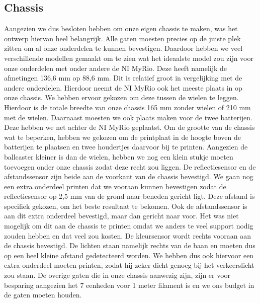 \documentclass[kulak]{kulakarticle} %
\begin{document}
\subsection{Chassis}
Aangezien we dus besloten hebben om onze eigen chassis te maken, was het ontwerp hiervan heel belangrijk. Alle gaten moesten precies op de juiste plek zitten om al onze onderdelen te kunnen bevestigen. Daardoor hebben we veel verschillende modellen gemaakt om te zien wat het ideaalste model zou zijn voor onze onderdelen met onder andere de NI MyRio. Deze heeft namelijk de afmetingen 136,6 mm op 88,6 mm. Dit is relatief groot in vergelijking met de andere onderdelen. Hierdoor neemt de NI MyRio ook het meeste plaats in op onze chassis. We hebben ervoor gekozen om deze tussen de wielen te leggen. Hierdoor is de totale breedte van onze chassis 165 mm zonder wielen of 210 mm met de wielen. Daarnaast moesten we ook plaats maken voor de twee batterijen. Deze hebben we net achter de NI MyRio geplaatst. Om de grootte van de chassis wat te beperken, hebben we gekozen om de printplaat in de hoogte boven de batterijen te plaatsen en twee houdertjes daarvoor bij te printen. Aangezien de ballcaster kleiner is dan de wielen, hebben we nog een klein stukje moeten toevoegen onder onze chassis zodat deze recht zou liggen. De reflectiesensor en de afstandssensor zijn beide aan de voorkant van de chassis bevestigd. We gaan nog een extra onderdeel printen dat we vooraan kunnen bevestigen zodat de reflectiesensor op 2,5 mm van de grond naar beneden gericht ligt. Deze afstand is specifiek gekozen, om het beste resultaat te bekomen. Ook de afstandssensor is aan dit extra onderdeel bevestigd, maar dan gericht naar voor. Het was niet mogelijk om dit aan de chassis te printen omdat we anders te veel support nodig zouden hebben en dat veel zou kosten. De kleursensor wordt rechts vooraan aan de chassis bevestigd. De lichten staan namelijk rechts van de baan en moeten dus op een heel kleine afstand gedetecteerd worden. We hebben dus ook hiervoor een extra onderdeel moeten printen, zodat hij zeker dicht genoeg bij het verkeerslicht zou staan. De overige gaten die in onze chassis aanwezig zijn, zijn er voor besparing aangezien het 7 eenheden voor 1 meter filament is en we ons budget in de gaten moeten houden. 
\end{document}
